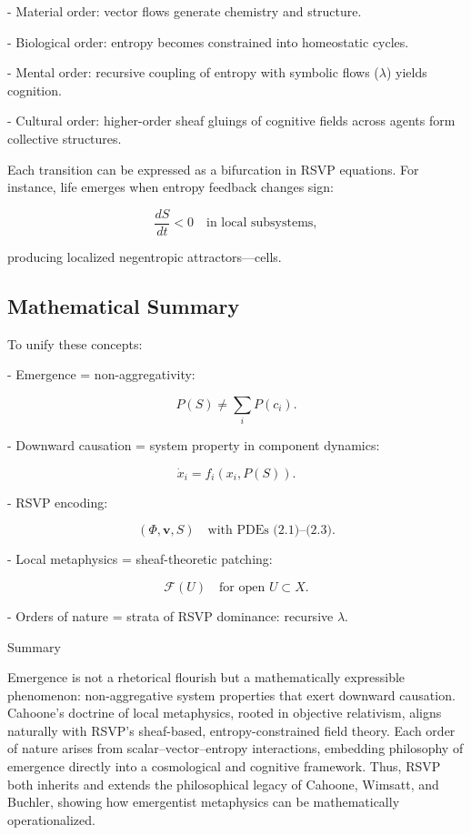 \documentclass[12pt]{book}
\begin{document}
- Material order: vector flows generate chemistry and structure.

- Biological order: entropy becomes constrained into homeostatic cycles.

- Mental order: recursive coupling of entropy with symbolic flows (\( \lambda \)) yields cognition.

- Cultural order: higher-order sheaf gluings of cognitive fields across agents form collective structures.

Each transition can be expressed as a bifurcation in RSVP equations. For instance, life emerges when entropy feedback changes sign:

\[ \frac{dS}{dt} < 0 \quad \text{in local subsystems}, \tag{2.4} \]

producing localized negentropic attractors—cells.

\subsection{Mathematical Summary}
To unify these concepts:

- Emergence = non-aggregativity:

\[ P(S) \neq \sum_i P(c_i). \]

- Downward causation = system property in component dynamics:

\[ \dot{x}_i = f_i(x_i, P(S)). \]

- RSVP encoding:

\[ (\Phi, \mathbf{v}, S) \quad \text{with PDEs (2.1)–(2.3)}. \]

- Local metaphysics = sheaf-theoretic patching:

\[ \mathcal{F}(U) \quad \text{for open } U \subset X. \]

- Orders of nature = strata of RSVP dominance: recursive \( \lambda \).

Summary

Emergence is not a rhetorical flourish but a mathematically expressible phenomenon: non-aggregative system properties that exert downward causation. Cahoone’s doctrine of local metaphysics, rooted in objective relativism, aligns naturally with RSVP’s sheaf-based, entropy-constrained field theory. Each order of nature arises from scalar–vector–entropy interactions, embedding philosophy of emergence directly into a cosmological and cognitive framework. Thus, RSVP both inherits and extends the philosophical legacy of Cahoone, Wimsatt, and Buchler, showing how emergentist metaphysics can be mathematically operationalized.
\end{document}

